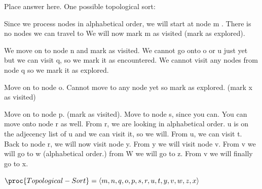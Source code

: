 \documentclass[addpoints,11pt]{exam}
\begin{document}
\begin{questions}
\begin{solutionorbox}
	Place answer here.
	One possible topological sort:
	
	Since we process nodes in alphabetical order, we will start at node m . There is no nodes we can travel to We will now mark m as visited (mark as explored).
	
	We move on to node n and mark as visited. We cannot go onto o or u just yet but we can visit q, so we mark it as encountered. We cannot visit any nodes from node q so we mark it as explored. 
	
	Move on to node o. Cannot move to any node yet so mark as explored. (mark x as visited)
	
	Move on to node p. (mark as visited). Move to node s, since you can. You can move onto node r as well. From r, we are looking in alphabetical order. u is on the adjecency list of u and we can visit it, so we will. From u, we can visit t. Back to node r, we will now visit node y. From y we will visit node v. From v we will go to w (alphabetical order.) from W we will go to z. From v we will finally go to x. 

	
	
	
	
	$\proc{Topological-Sort} = \left< m, n, q, o, p, s, r, u, t, y , v, w, z, x \right>$
	
	 
\end{solutionorbox}

\newpage


\end{questions}
\end{document}
